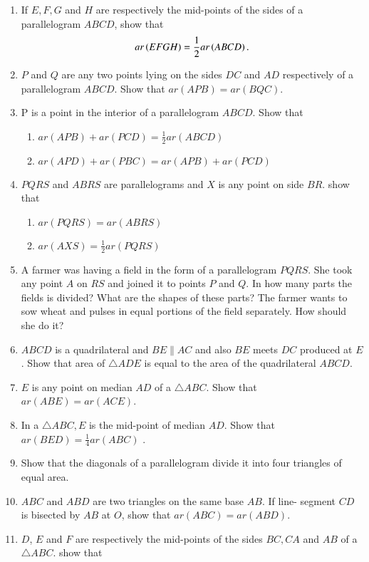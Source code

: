 \begin{enumerate}[label=\thesection.\arabic*.,ref=\thesection.\theenumi]
\item If $E,F,G$ and $H$ are respectively the mid-points of the sides of a parallelogram $ABCD$, show that
\begin{align}
ar \left(EFGH\right) =
\frac{1}{ 2}
ar \left(ABCD\right) .
\end{align}
%
\item $P$ and $Q$ are any two points lying on the sides $DC$ and $AD$ respectively of a parallelogram $ABCD$. Show that $ar (APB) = ar (BQC)$.
%
\item P is a point in the interior of a parallelogram $ABCD$. Show that
\begin{enumerate}
\item $ar (APB) + ar (PCD) = \frac{1}{ 2}ar (ABCD)$
\item $ar (APD) + ar (PBC) = ar (APB) + ar (PCD)$
\end{enumerate}
%
\item $PQRS$ and $ABRS$ are parallelograms and $X$ is any point on side $BR$. show that 
\begin{enumerate} 
\item $ar (PQRS) = ar (ABRS)$
\item $ar (AX S) = \frac{1}{ 2} ar (PQRS)$
\end{enumerate}
%
\item A farmer was having a field in the form of a parallelogram $PQRS$. She took any point $A$ on $RS$ and joined it to points $P$ and $Q$. In how many parts the fields is divided? What are the shapes of these parts? The farmer wants to sow wheat and pulses in equal portions of the field separately. How should she do it?
%
\item $ABCD$ is a quadrilateral and $BE  \parallel  AC$ and also $BE$ meets $DC$ produced at $E$. Show that area of $ \triangle  ADE$ is equal to the area of the quadrilateral $ABCD$.
%
\item $E$ is any point on median $AD$ of a  $\triangle  ABC$. Show that $ar (ABE) = ar (ACE)$.
\item  In a $\triangle ABC, E$ is the mid-point of median $AD$. Show that $ar (BED) = \frac{1}{ 4}ar(ABC)$ .
\item  Show that the diagonals of a parallelogram divide it into four triangles of equal area.
\item   $ABC$ and $ABD$ are two triangles on the same base $AB$. If line- segment $CD$ is bisected by $AB$ at $O$, show that $ar(ABC) = ar (ABD)$.
%
\item $D$, $E$ and $F$ are respectively the mid-points of the sides $BC, CA$ and $AB$ of a $ \triangle  ABC$. show that 

\end{enumerate}
